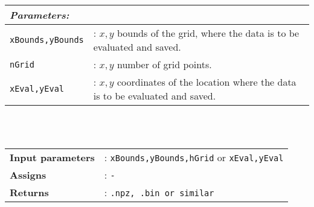 		\begin{tabular}{lp{10cm}}
			\textit{Parameters:} & \\ \hline
			\texttt{xBounds,yBounds} &: $x,y$ bounds of the grid, where the data is to be evaluated and saved.\\ 
			\texttt{nGrid} &: $x,y$ number of grid points.\\
			\texttt{xEval,yEval} &: $x,y$ coordinates of the location where the data is to be evaluated and saved.\\ 
		\end{tabular} \vspace{5 mm}\\
	\\
	\begin{tabular}{lp{10cm}}
		\textbf{Input parameters} &: \texttt{xBounds,yBounds,hGrid} or \texttt{xEval,yEval}\\ 
		\textbf{Assigns} &: \texttt{-}\\ 			
		\textbf{Returns} &: \texttt{.npz, .bin or similar}\\ 					
	\end{tabular}



